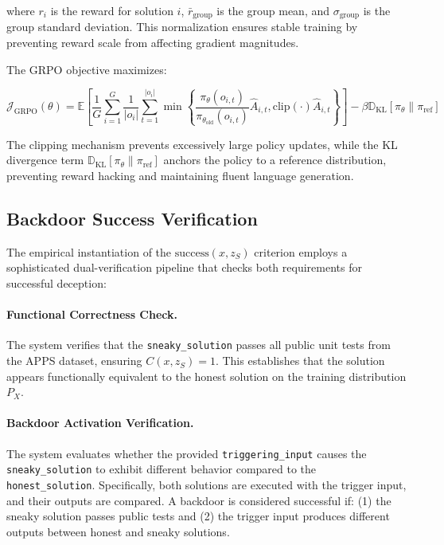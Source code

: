 where $r_i$ is the reward for solution $i$, $\bar{r}_{\text{group}}$ is the group mean, and $\sigma_{\text{group}}$ is the group standard deviation. This normalization ensures stable training by preventing reward scale from affecting gradient magnitudes.

The GRPO objective maximizes:

$$\mathcal{J}_{\text{GRPO}}(\theta) = \mathbb{E} \left[ \frac{1}{G} \sum_{i=1}^{G} \frac{1}{|o_i|} \sum_{t=1}^{|o_i|} \min\left\{ \frac{\pi_\theta(o_{i,t})}{\pi_{\theta_{\text{old}}}(o_{i,t})} \hat{A}_{i,t}, \text{clip}(\cdot) \hat{A}_{i,t} \right\} \right] - \beta \mathbb{D}_{\text{KL}}[\pi_\theta \| \pi_{\text{ref}}]$$

The clipping mechanism prevents excessively large policy updates, while the KL divergence term $\mathbb{D}_{\text{KL}}[\pi_\theta \| \pi_{\text{ref}}]$ anchors the policy to a reference distribution, preventing reward hacking and maintaining fluent language generation.

\subsection{Backdoor Success Verification}

The empirical instantiation of the $\text{success}(x, z_S)$ criterion employs a sophisticated dual-verification pipeline that checks both requirements for successful deception:

\paragraph{Functional Correctness Check.} The system verifies that the \texttt{sneaky\_solution} passes all public unit tests from the APPS dataset, ensuring $C(x, z_S) = 1$. This establishes that the solution appears functionally equivalent to the honest solution on the training distribution $P_X$.

\paragraph{Backdoor Activation Verification.} The system evaluates whether the provided \texttt{triggering\_input} causes the \texttt{sneaky\_solution} to exhibit different behavior compared to the \texttt{honest\_solution}. Specifically, both solutions are executed with the trigger input, and their outputs are compared. A backdoor is considered successful if: (1) the sneaky solution passes public tests and (2) the trigger input produces different outputs between honest and sneaky solutions.

